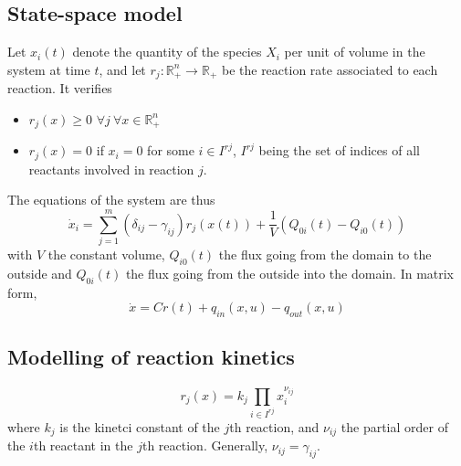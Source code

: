 \documentclass[12pt, openany]{report}
\theoremstyle{definition}
\newcommand{\R}{\mathbb{R}}
\begin{document}
\subsection{State-space model}
Let $x_i(t)$ denote the quantity of the species $X_i$ per unit of volume in the system at time $t$, and let $r_j:\R^n_+\rightarrow \R_+$ be the reaction rate associated to each reaction. It verifies 
\begin{itemize}
    \item $r_j(x)\ge 0$ $\forall j\: \forall x\in \R_+^n$
    \item $r_j(x)=0$ if $x_i=0$ for some $i\in I^{rj}$, $I^{rj}$ being the set of indices of all reactants involved in reaction $j$.
\end{itemize}
The equations of the system are thus
\begin{equation}
    \dot x_i = \sum_{j=1}^m (\delta_{ij}-\gamma_{ij})r_j(x(t))+\frac{1}{V}(Q_{0i}(t)-Q_{i0}(t))
\end{equation}
with $V$ the constant volume, $Q_{i0}(t)$ the flux going from the domain to the outside and $Q_{0i}(t)$ the flux going from the outside into the domain. In matrix form,
\begin{equation}
    \dot x= Cr(t)+q_{in}(x,u)-q_{out}(x,u)
\end{equation}
\subsection{Modelling of reaction kinetics}
\begin{equation}
    r_j(x) = k_j \prod_{i\in I^{rj}} x_i^{\nu_{ij}}
\end{equation}
where $k_j$ is the kinetci constant of the $j$th reaction, and $\nu_{ij}$ the partial order of the $i$th reactant in the $j$th reaction. Generally, $\nu_{ij}=\gamma_{ij}$. 
\end{document}

